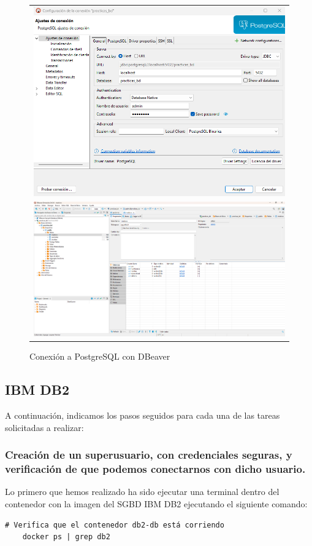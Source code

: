\documentclass{article}
\begin{document}
\begin{figure}[H]
    \centering
    \begin{tabular}{c}  %
        \includegraphics[width=1\textwidth]{Captura de pantalla 2025-02-23 215450.png}\\[10pt]
        \includegraphics[width=1\textwidth]{Captura de pantalla 2025-02-23 215235.png} 
    \end{tabular}
    \caption{Conexión a PostgreSQL con DBeaver}
    \label{fig:Configuracion_DBeaver_PostgreSQL}
\end{figure}


\newpage
\subsection{IBM DB2}
A continuación, indicamos los pasos seguidos para cada una de las tareas solicitadas a realizar:
\subsubsection{Creación de un superusuario, con credenciales seguras, y verificación de que podemos conectarnos con dicho usuario.}
Lo primero que hemos realizado ha sido ejecutar una terminal dentro del contenedor con la imagen del SGBD IBM DB2 ejecutando el siguiente comando:
\begin{lstlisting}[style=bashStyle]
    # Verifica que el contenedor db2-db está corriendo
    docker ps | grep db2
\end{lstlisting}
\end{document}
